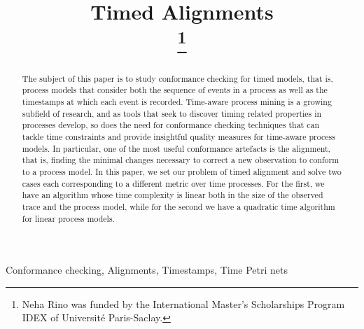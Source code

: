 \documentclass[conference]{IEEEtran}
\newcounter{cases}
\begin{document}
	\title{Timed Alignments\\
		\thanks{Neha Rino was funded by the International Master's Scholarships Program IDEX of Université Paris-Saclay.}
	}
	
	\author{
		
		\and
	}
	
	
	\maketitle
	
	\begin{abstract}
		The subject of this paper is to study conformance checking for timed models, that is, process models that consider both the sequence of events in a process as well as the timestamps at which each event is recorded. 
		Time-aware process mining is a growing subfield of research, and as tools that seek to discover timing related properties in processes develop, so does the need for conformance checking techniques that can tackle time constraints and provide insightful quality measures for time-aware process models. 
		In particular, one of the most useful conformance artefacts is the alignment, that is, finding the minimal changes necessary to correct a new observation to conform to a process model.  
		In this paper, we set our problem of timed alignment and solve two cases each corresponding to a different metric over time processes. For the first, we have an algorithm whose time complexity is linear both in the size of the observed trace and the process model, while for the second we have a quadratic time algorithm for linear process models. 
	\end{abstract}
	
	
	\begin{IEEEkeywords}
		Conformance checking, Alignments, Timestamps, Time Petri nets
	\end{IEEEkeywords}
	
\end{document}
